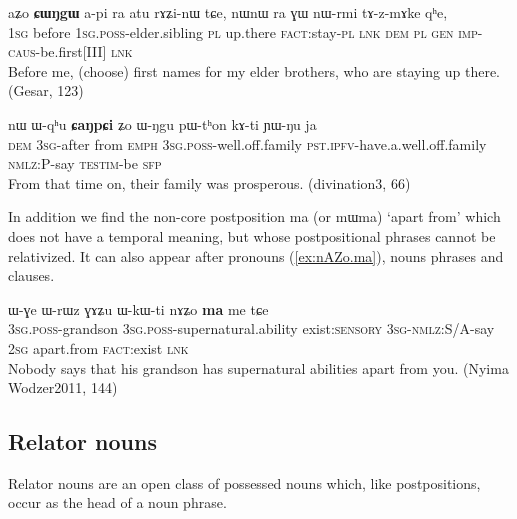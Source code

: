 \documentclass[oldfontcommands,oneside,a4paper,11pt]{article}
\newcommand{\ipa}[1]{{\phon \mbox{#1}}} %
\begin{document}
\begin{exe}
   \ex \label{ex:aZo.CWNgW}
 \gll 
\ipa{aʑo}  	\ipa{\textbf{ɕɯŋgɯ}}  	\ipa{a-pi}  	\ipa{ra}  	\ipa{atu}  	\ipa{rɤʑi-nɯ}  	\ipa{tɕe,}  	\ipa{nɯnɯ}  	\ipa{ra}  	\ipa{ɣɯ}  	\ipa{nɯ-rmi}  	\ipa{tɤ-z-mɤke}  	\ipa{qʰe,}   \\
\textsc{1sg} before \textsc{1sg.poss}-elder.sibling \textsc{pl} up.there \textsc{fact}:stay-\textsc{pl} \textsc{lnk} \textsc{dem} \textsc{pl} \textsc{gen} \textsc{imp-caus}-be.first[III] \textsc{lnk} \\
\glt Before me, (choose) first names for my elder brothers, who are staying up there. (Gesar, 123)
 \end{exe}
\begin{exe}
\ex \label{ex:CaNpCi1} 
\gll  
\ipa{nɯ}   	\ipa{ɯ-qʰu}   	\textbf{\ipa{ɕaŋpɕi}}   	\ipa{ʑo}   	\ipa{ɯ-ŋgu}   	\ipa{pɯ-tʰon}   	\ipa{kɤ-ti}   	\ipa{ɲɯ-ŋu}   	\ipa{ja}   \\
\textsc{dem} \textsc{3sg}-after from  \textsc{emph} \textsc{3sg.poss}-well.off.family  \textsc{pst.ipfv}-have.a.well.off.family \textsc{nmlz:P}-say \textsc{testim}-be \textsc{sfp} \\
\glt  From that time on, their family was prosperous.   (divination3, 66)
\end{exe}

 In addition we find the non-core postposition \ipa{ma} (or \ipa{mɯma}) `apart from' which does not have a temporal meaning, but whose postpositional phrases cannot be relativized. It can also appear after pronouns (\ref{ex:nAZo.ma}), nouns phrases and clauses.
 \begin{exe}
\ex \label{ex:nAZo.ma} 
\gll  
 \ipa{ɯ-ɣe}  	\ipa{ɯ-rɯz}  	\ipa{ɣɤʑu}  	\ipa{ɯ-kɯ-ti}  	 	\ipa{nɤʑo}  	\ipa{\textbf{ma}}  	\ipa{me}  	\ipa{tɕe}  \\
  \textsc{3sg.poss}-grandson   \textsc{3sg.poss}-supernatural.ability exist:\textsc{sensory} \textsc{3sg-nmlz:S/A}-say \textsc{2sg} apart.from \textsc{fact}:exist \textsc{lnk} \\
\glt Nobody says that his grandson has supernatural abilities apart from you. (Nyima Wodzer2011, 144)
\end{exe}

\subsection{Relator nouns} \label{sec:relator}
Relator nouns are an open class of possessed nouns which, like postpositions, occur as the head of a noun phrase. 
\end{document}
